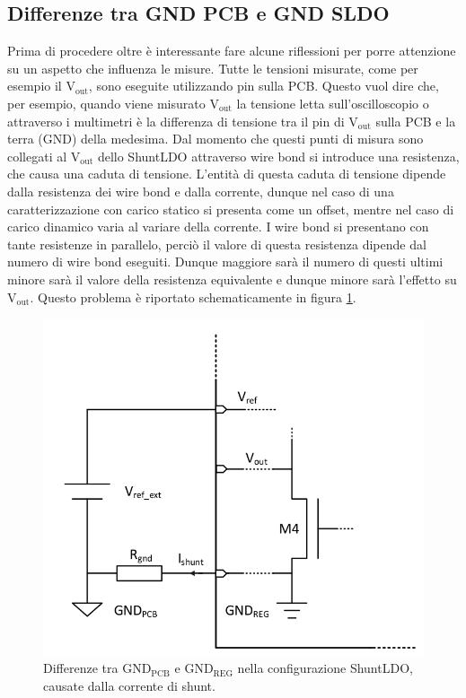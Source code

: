 \subsection{Differenze tra GND PCB e GND SLDO}
Prima di procedere oltre è interessante fare alcune riflessioni per porre attenzione su un aspetto che influenza le misure. 
Tutte le tensioni misurate, come per esempio il $\mathrm{V_{out}}$, sono eseguite utilizzando pin sulla PCB. Questo vuol dire che, per esempio, quando viene misurato $\mathrm{V_{out}}$ la tensione letta sull'oscilloscopio o attraverso i multimetri è la differenza di tensione tra il pin di $\mathrm{V_{out}}$ sulla PCB e la terra (GND) della medesima. Dal momento che questi punti di misura sono collegati al $\mathrm{V_{out}}$ dello ShuntLDO attraverso wire bond si introduce una resistenza, che causa una caduta di tensione. L'entità di questa caduta di tensione dipende dalla resistenza dei wire bond e dalla corrente, dunque nel caso di una caratterizzazione con carico statico si presenta come un offset, mentre nel caso di carico dinamico varia al variare della corrente. 
I wire bond si presentano con tante resistenze in parallelo, perciò il valore di questa resistenza dipende dal numero di wire bond eseguiti. Dunque maggiore sarà il numero di questi ultimi minore sarà il valore della resistenza equivalente e dunque minore sarà l'effetto su $\mathrm{V_{out}}$. Questo problema è riportato schematicamente in figura \ref{Ground}.

\begin{figure}
\centering
\includegraphics[scale=.3]{Immagini/Ground}
\caption{Differenze tra $\mathrm{GND_{PCB}}$ e $\mathrm{GND_{REG}}$ nella configurazione ShuntLDO, causate dalla corrente di shunt.}
\label{Ground}
\end{figure}


